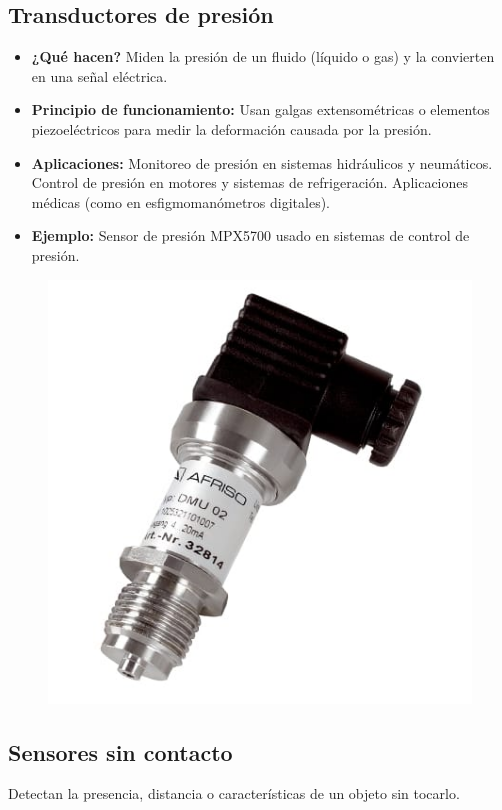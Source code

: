 \subsection*{Transductores de presión}
\begin{itemize}
	\item \textbf{¿Qué hacen?} Miden la presión de un fluido (líquido o gas) y la convierten en una señal eléctrica.
	\item \textbf{Principio de funcionamiento:} Usan galgas extensométricas o elementos piezoeléctricos para medir la deformación causada por la presión.
	\item \textbf{Aplicaciones:} Monitoreo de presión en sistemas hidráulicos y neumáticos.
	Control de presión en motores y sistemas de refrigeración.
	Aplicaciones médicas (como en esfigmomanómetros digitales).
	\item \textbf{Ejemplo:} Sensor de presión MPX5700 usado en sistemas de control de presión.
\end{itemize}
\begin{figure}[h]
	\centering
	\includegraphics[width=0.3\linewidth]{img/transductor de presion}
	\label{fig:transductor de presion}
\end{figure}
\subsection{Sensores sin contacto}
Detectan la presencia, distancia o características de un objeto sin tocarlo.
